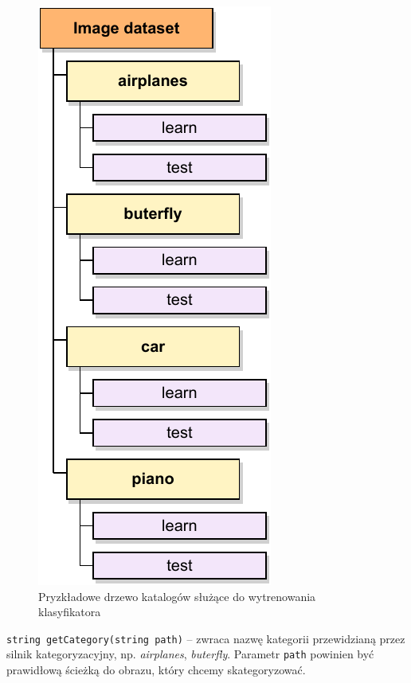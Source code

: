 \begin{compactitem}
	\begin{figure}[h]
		\centering
		\includegraphics[scale=1.0]{graphics/03_implementacja/api-directory-tree.pdf}
		\caption{ Pryzkładowe drzewo katalogów służące do wytrenowania klasyfikatora }
		\label{fig:api-directory-tree}
	\end{figure}
	
	\item \texttt{string getCategory(string path)} -- zwraca nazwę kategorii przewidzianą przez silnik kategoryzacyjny, np. \emph{airplanes}, \emph{buterfly}. Parametr \texttt{path} powinien być prawidłową ścieżką do obrazu, który chcemy skategoryzować.
\end{compactitem}